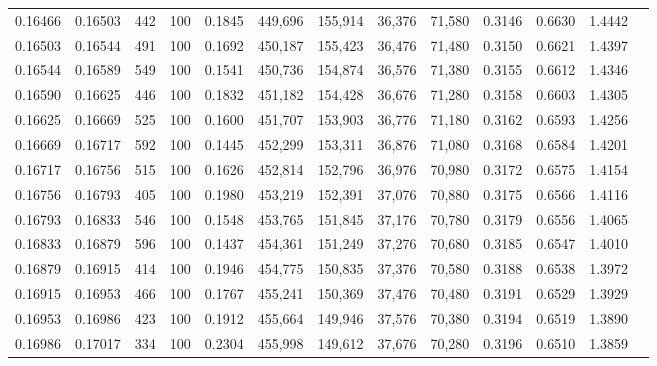 \begin{tabular}{rrrrrrrrrrrrr}
0.16466 & 0.16503 &   442 & 100 &                                     0.1845 & 449,696 & 155,914 &  36,376 &  71,580 & 0.3146 & 0.6630 & 1.4442 \\
0.16503 & 0.16544 &   491 & 100 &                                     0.1692 & 450,187 & 155,423 &  36,476 &  71,480 & 0.3150 & 0.6621 & 1.4397 \\
0.16544 & 0.16589 &   549 & 100 &                                     0.1541 & 450,736 & 154,874 &  36,576 &  71,380 & 0.3155 & 0.6612 & 1.4346 \\
0.16590 & 0.16625 &   446 & 100 &                                     0.1832 & 451,182 & 154,428 &  36,676 &  71,280 & 0.3158 & 0.6603 & 1.4305 \\
0.16625 & 0.16669 &   525 & 100 &                                     0.1600 & 451,707 & 153,903 &  36,776 &  71,180 & 0.3162 & 0.6593 & 1.4256 \\
0.16669 & 0.16717 &   592 & 100 &                                     0.1445 & 452,299 & 153,311 &  36,876 &  71,080 & 0.3168 & 0.6584 & 1.4201 \\
0.16717 & 0.16756 &   515 & 100 &                                     0.1626 & 452,814 & 152,796 &  36,976 &  70,980 & 0.3172 & 0.6575 & 1.4154 \\
0.16756 & 0.16793 &   405 & 100 &                                     0.1980 & 453,219 & 152,391 &  37,076 &  70,880 & 0.3175 & 0.6566 & 1.4116 \\
0.16793 & 0.16833 &   546 & 100 &                                     0.1548 & 453,765 & 151,845 &  37,176 &  70,780 & 0.3179 & 0.6556 & 1.4065 \\
0.16833 & 0.16879 &   596 & 100 &                                     0.1437 & 454,361 & 151,249 &  37,276 &  70,680 & 0.3185 & 0.6547 & 1.4010 \\
0.16879 & 0.16915 &   414 & 100 &                                     0.1946 & 454,775 & 150,835 &  37,376 &  70,580 & 0.3188 & 0.6538 & 1.3972 \\
0.16915 & 0.16953 &   466 & 100 &                                     0.1767 & 455,241 & 150,369 &  37,476 &  70,480 & 0.3191 & 0.6529 & 1.3929 \\
0.16953 & 0.16986 &   423 & 100 &                                     0.1912 & 455,664 & 149,946 &  37,576 &  70,380 & 0.3194 & 0.6519 & 1.3890 \\
0.16986 & 0.17017 &   334 & 100 &                                     0.2304 & 455,998 & 149,612 &  37,676 &  70,280 & 0.3196 & 0.6510 & 1.3859 \\

\end{tabular}
